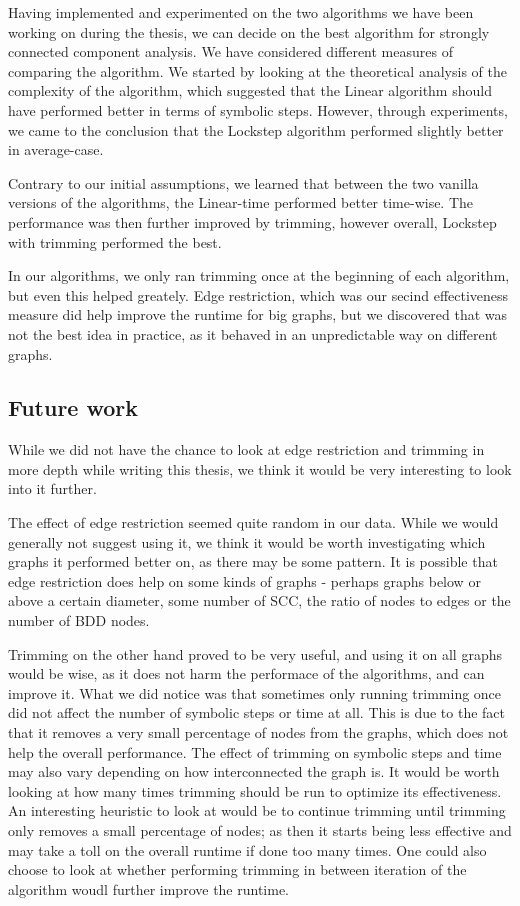 \documentclass[../master/master.tex]{subfiles}
\begin{document}
Having implemented and experimented on the two algorithms we have been working on during the thesis, we can decide on the best algorithm for strongly connected component analysis. We have considered different measures of comparing the algorithm. We started by looking at the theoretical analysis of the complexity of the algorithm, which suggested that the Linear algorithm should have performed better in terms of symbolic steps. However, through experiments, we came to the conclusion that the Lockstep algorithm performed slightly better in average-case.

Contrary to our initial assumptions, we learned that between the two vanilla versions of the algorithms, the Linear-time performed better time-wise. The performance was then further improved by trimming, however overall, Lockstep with trimming performed the best.

In our algorithms, we only ran trimming once at the beginning of each algorithm, but even this helped greately. Edge restriction, which was our secind effectiveness measure did help improve the runtime for big graphs, but we discovered that was not the best idea in practice, as it behaved in an unpredictable way on different graphs.

\subsection{Future work}
While we did not have the chance to look at edge restriction and trimming in more depth while writing this thesis, we think it would be very interesting to look into it further.

The effect of edge restriction seemed quite random in our data. While we would generally not suggest using it, we think it would be worth investigating which graphs it performed better on, as there may be some pattern. It is possible that edge restriction does help on some kinds of graphs - perhaps graphs below or above a certain diameter, some number of SCC, the ratio of nodes to edges or the number of BDD nodes.

Trimming on the other hand proved to be very useful, and using it on all graphs would be wise, as it does not harm the performace of the algorithms, and can improve it. What we did notice was that sometimes only running trimming once did not affect the number of symbolic steps or time at all. This is due to the fact that it removes a very small percentage of nodes from the graphs, which does not help the overall performance. The effect of trimming on symbolic steps and time may also vary depending on how interconnected the graph is. It would be worth looking at how many times trimming should be run to optimize its effectiveness. An interesting heuristic to look at would be to continue trimming until trimming only removes a small percentage of nodes; as then it starts being less effective and may take a toll on the overall runtime if done too many times. One could also choose to look at whether performing trimming in between iteration of the algorithm woudl further improve the runtime.
\end{document}

